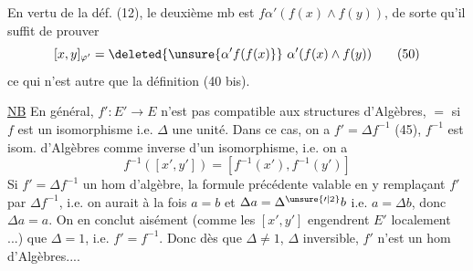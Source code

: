 En vertu de la déf. (12), le deuxième mb est $f\alpha'(f(x)\wedge f(y))$, de sorte qu'il suffit de prouver
\[
 [x,y]_{\varphi'}=\deleted{\unsure{\alpha'f(f(x)}}\ \alpha'(f(x)\wedge f(y)) \tag*{(50)}
\]
ce qui n'est autre que la définition (40 bis).

\uline{NB} En général, $f':E'\to E$ n'est pas compatible aux structures d'Algèbres, $=$ si $f$ est un isomorphisme i.e. $\Delta$ une unité. Dans ce cas, on a $f'=\Delta f^{-1}$ (45),   $f^{-1}$ est  isom. d'Algèbres comme inverse d'un isomorphisme, i.e. on a
\[
 f^{-1}([x',y'])=[f^{-1}(x'),f^{-1}(y')]
\]
Si $f'=\Delta f^{-1}$  un hom d'algèbre, la  formule précédente  valable en y remplaçant $f'$ par $\Delta f^{-1}$, i.e. on aurait à la fois $a=b$ et $\Delta a=\Delta^{\unsure{\prime|2}} b$ i.e. $a=\Delta b$, donc $\Delta a=a$.  On en conclut aisément (comme les $[x',y']$ engendrent $E'$ localement ...) que $\Delta=1$,  i.e. $f'=f^{-1}$. Donc dès que $\Delta\ne1$, $\Delta$ inversible, $f'$ n'est \uline{} un hom d'Algèbres....

